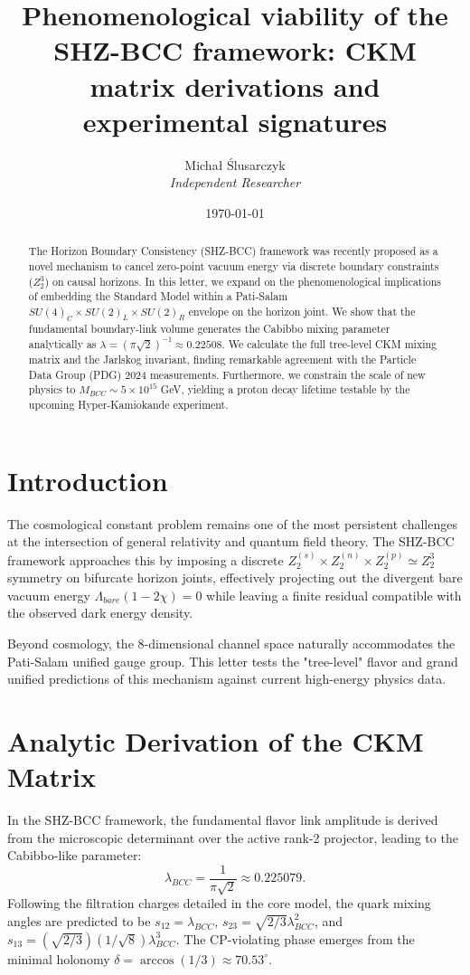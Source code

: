 \documentclass[11pt,a4paper]{article}
\title{\textbf{Phenomenological viability of the SHZ-BCC framework: CKM matrix derivations and experimental signatures}}
\author{Micha\l{} \'Slusarczyk \\ \small{\textit{Independent Researcher}}}
\date{\today}
\begin{document}
\maketitle

\begin{abstract}
The Horizon Boundary Consistency (SHZ-BCC) framework was recently proposed as a novel mechanism to cancel zero-point vacuum energy via discrete boundary constraints ($Z_2^3$) on causal horizons. In this letter, we expand on the phenomenological implications of embedding the Standard Model within a Pati-Salam $SU(4)_C \times SU(2)_L \times SU(2)_R$ envelope on the horizon joint. We show that the fundamental boundary-link volume generates the Cabibbo mixing parameter analytically as $\lambda = (\pi\sqrt{2})^{-1} \approx 0.22508$. We calculate the full tree-level CKM mixing matrix and the Jarlskog invariant, finding remarkable agreement with the Particle Data Group (PDG) 2024 measurements. Furthermore, we constrain the scale of new physics to $M_{BCC} \sim 5 \times 10^{15}$ GeV, yielding a proton decay lifetime testable by the upcoming Hyper-Kamiokande experiment.
\end{abstract}

\section{Introduction}
The cosmological constant problem remains one of the most persistent challenges at the intersection of general relativity and quantum field theory. The SHZ-BCC framework approaches this by imposing a discrete $Z_2^{(s)} \times Z_2^{(n)} \times Z_2^{(p)} \simeq Z_2^3$ symmetry on bifurcate horizon joints, effectively projecting out the divergent bare vacuum energy $\Lambda_{bare}(1-2\chi) = 0$ while leaving a finite residual compatible with the observed dark energy density.

Beyond cosmology, the 8-dimensional channel space naturally accommodates the Pati-Salam unified gauge group. This letter tests the "tree-level" flavor and grand unified predictions of this mechanism against current high-energy physics data.

\section{Analytic Derivation of the CKM Matrix}
In the SHZ-BCC framework, the fundamental flavor link amplitude is derived from the microscopic determinant over the active rank-2 projector, leading to the Cabibbo-like parameter:
\begin{equation}
    \lambda_{BCC} = \frac{1}{\pi\sqrt{2}} \approx 0.225079.
\end{equation}
Following the filtration charges detailed in the core model, the quark mixing angles are predicted to be $s_{12} = \lambda_{BCC}$, $s_{23} = \sqrt{2/3}\lambda_{BCC}^2$, and $s_{13} = (\sqrt{2/3})(1/\sqrt{8})\lambda_{BCC}^3$. The CP-violating phase emerges from the minimal holonomy $\delta = \arccos(1/3) \approx 70.53^\circ$.
\end{document}
